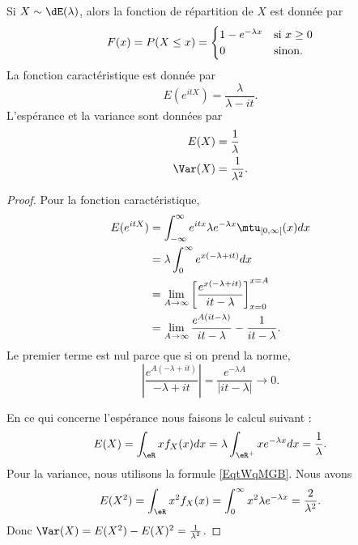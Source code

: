\begin{proposition} \label{PropTxGcWn}
    Si \( X\sim\dE(\lambda)\), alors la fonction de répartition de \( X\) est donnée par
    \begin{equation}
        F(x)=P(X\leq x)=\begin{cases}
            1- e^{-\lambda x}    &   \text{si \( x\geq 0\)}\\
            0    &    \text{sinon}.
    \end{cases}
    \end{equation}
    La fonction caractéristique est donnée par
    \begin{equation}
        E( e^{itX})=\frac{ \lambda }{ \lambda-it }.
    \end{equation}
    L'espérance et la variance sont données par
    \begin{equation}
        \begin{aligned}[]
            E(X)&=\frac{1}{ \lambda }\\
            \Var(X)&=\frac{1}{ \lambda^2 }.
        \end{aligned}
    \end{equation}
\end{proposition}

\begin{proof}    
    Pour la fonction caractéristique,
    \begin{subequations}
        \begin{align}
            E( e^{itX})&=\int_{-\infty}^{\infty} e^{it x}\lambda e^{-\lambda x}\mtu_{\mathopen[ 0 , \infty [}(x)dx\\
            &=\lambda\int_0^{\infty} e^{x(-\lambda+it)}dx\\
            &=\lim_{A\to\infty}\left[  \frac{  e^{x(-\lambda+it)} }{ it-\lambda } \right]_{x=0}^{x=A}\\
            &=\lim_{A\to \infty}\frac{  e^{A(it-\lambda)} }{ it-\lambda }-\frac{1}{ it-\lambda }.
        \end{align}
    \end{subequations}
    Le premier terme est nul parce que si on prend la norme,
    \begin{equation}
        \left| \frac{  e^{A(-\lambda+it)} }{ -\lambda+it } \right| =\frac{  e^{-\lambda A} }{ | it-\lambda | }\to 0.
    \end{equation}

    En ce qui concerne l'espérance nous faisons le calcul suivant :
    \begin{equation}
        E(X)=\int_{\eR}xf_X(x)dx=\lambda\int_{\eR^+}x e^{-\lambda x}dx=\frac{1}{ \lambda }.
    \end{equation}
    Pour la variance, nous utilisons la formule \eqref{EqtWqMGB}. Nous avons
    \begin{equation}
        E(X^2)=\int_{\eR}x^2f_X(x)=\int_0^{\infty}x^2\lambda e^{-\lambda x}=\frac{ 2 }{ \lambda^2 }.
    \end{equation}
    Donc \( \Var(X)=E(X^2)-E(X)^2=\frac{1}{ \lambda^2 }\).
\end{proof}

